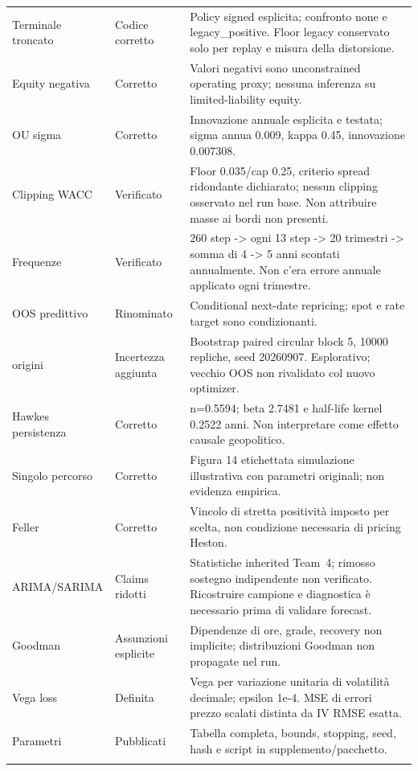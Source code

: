 \documentclass[10pt,a4paper]{article}
\begin{document}
\begin{longtable}{p{}p{}p{}}
Terminale troncato & Codice corretto & Policy signed esplicita; confronto none e legacy\_positive. Floor legacy conservato solo per replay e misura della distorsione. \\ \addlinespace
Equity negativa & Corretto & Valori negativi sono unconstrained operating proxy; nessuna inferenza su limited-liability equity. \\ \addlinespace
OU sigma & Corretto & Innovazione annuale esplicita e testata; sigma annua 0.009, kappa 0.45, innovazione 0.007308. \\ \addlinespace
Clipping WACC & Verificato & Floor 0.035/cap 0.25, criterio spread ridondante dichiarato; nessun clipping osservato nel run base. Non attribuire masse ai bordi non presenti. \\ \addlinespace
Frequenze & Verificato & 260 step -> ogni 13 step -> 20 trimestri -> somma di 4 -> 5 anni scontati annualmente. Non c’era errore annuale applicato ogni trimestre. \\ \addlinespace
OOS predittivo & Rinominato & Conditional next-date repricing; spot e rate target sono condizionanti. \\ \addlinespace
30 origini & Incertezza aggiunta & Bootstrap paired circular block 5, 10000 repliche, seed 20260907. Esplorativo; vecchio OOS non rivalidato col nuovo optimizer. \\ \addlinespace
Hawkes persistenza & Corretto & n=0.5594; beta 2.7481 e half-life kernel 0.2522 anni. Non interpretare come effetto causale geopolitico. \\ \addlinespace
Singolo percorso & Corretto & Figura 14 etichettata simulazione illustrativa con parametri originali; non evidenza empirica. \\ \addlinespace
Feller & Corretto & Vincolo di stretta positività imposto per scelta, non condizione necessaria di pricing Heston. \\ \addlinespace
ARIMA/SARIMA & Claims ridotti & Statistiche inherited Team~4; rimosso sostegno indipendente non verificato. Ricostruire campione e diagnostica è necessario prima di validare forecast. \\ \addlinespace
Goodman & Assunzioni esplicite & Dipendenze di ore, grade, recovery non implicite; distribuzioni Goodman non propagate nel run. \\ \addlinespace
Vega loss & Definita & Vega per variazione unitaria di volatilità decimale; epsilon 1e-4. MSE di errori prezzo scalati distinta da IV RMSE esatta. \\ \addlinespace
Parametri & Pubblicati & Tabella completa, bounds, stopping, seed, hash e script in supplemento/pacchetto. \\ \addlinespace

\end{longtable}
\end{document}
